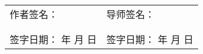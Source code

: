 {  {
	\fangsong\sihao
	\begin{tabular}{@{} p{0.5\linewidth} p{0.5\linewidth} @{}}
		作者签名： & 导师签名： \\
		& \\
		& \\
		签字日期： \hspace{2em} 年 \hspace{2em} 月 \hspace{2em} 日 & 签字日期： \hspace{2em} 年 \hspace{2em} 月 \hspace{2em} 日 \\
	\end{tabular} \par
	}
%
%
%
%
%
%
%
}
